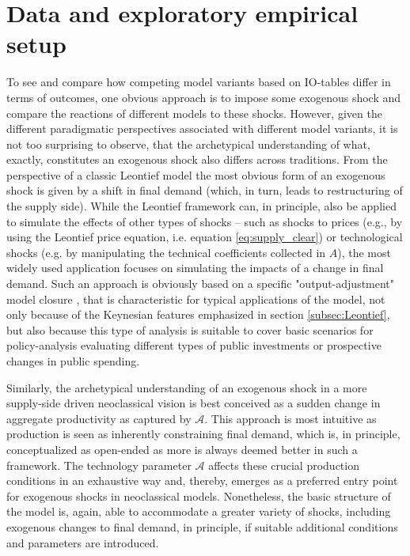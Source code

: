 
\section{Data and exploratory empirical setup} \label{sec:data}

To see and compare how competing model variants based on IO-tables differ in terms of outcomes, one obvious approach is to impose some exogenous shock and compare the reactions of different models to these shocks. However, given the different paradigmatic perspectives associated with different model variants, it is not too surprising to observe, that the archetypical understanding of what, exactly, constitutes an exogenous shock also differs across traditions. From the perspective of a classic Leontief model the most obvious form of an exogenous shock is given by a shift in final demand (which, in turn, leads to restructuring of the supply side). While the Leontief framework can, in principle, also be applied to simulate the effects of other types of shocks -- such as shocks to prices (e.g., by using the Leontief price equation, i.e. equation \eqref{eq:supply_clear}) or technological shocks (e.g. by manipulating the technical coefficients collected in $A$), the most widely used application focuses on simulating the impacts of a change in final demand. Such an approach is obviously based on a specific "output-adjustment" model closure \citep{Taylor1990}, that is characteristic for typical applications of the model, not only because of the Keynesian features emphasized in section \ref{subsec:Leontief}, but also because this type of analysis is suitable to cover basic scenarios for policy-analysis evaluating different types of public investments or prospective changes in public spending.

Similarly, the archetypical understanding of an exogenous shock in a more supply-side driven neoclassical vision is best conceived as a sudden change in aggregate productivity as captured by $\mathbf{\mathcal A}$. This approach is most intuitive as production is seen as inherently constraining final demand, which is, in principle, conceptualized as open-ended as more is always deemed better in such a framework. The technology parameter $\mathbf{\mathcal A}$ affects these crucial production conditions in an exhaustive way and, thereby, emerges as a preferred entry point for exogenous shocks in neoclassical models. Nonetheless, the basic structure of the model is, again, able to accommodate a greater variety of shocks, including exogenous changes to final demand, in principle, if suitable additional conditions and parameters are introduced.


